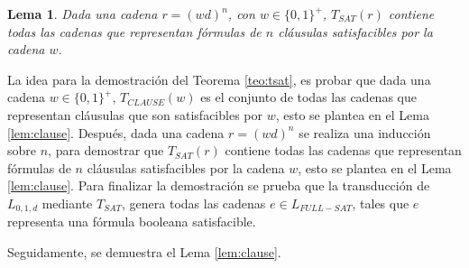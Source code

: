 \documentclass[12pt]{article}
\newtheorem{lemma}{Lema}
\begin{document}
\begin{lemma}
    \label{lem:sat}
    Dada una cadena $r=(wd)^n$, con $w\in\{0,1\}^+$, $T_{SAT}(r)$ contiene todas las cadenas que representan fórmulas de $n$ cláusulas satisfacibles por la cadena $w$.
\end{lemma}

La idea para la demostración del Teorema \ref{teo:tsat}, es probar que dada una cadena $w\in \{0,1\}^+$, 
$T_{CLAUSE}(w)$ es el conjunto de todas las cadenas que representan cláusulas que son satisfacibles por $w$, 
esto se plantea en el Lema \ref{lem:clause}. Después, dada una cadena $r=(wd)^n$ se realiza una inducción 
sobre $n$, para demostrar que $T_{SAT}(r)$ contiene todas las cadenas que representan fórmulas de $n$
cláusulas satisfacibles por la cadena $w$, esto se plantea en el Lema \ref{lem:clause}.  
Para finalizar la demostración se prueba que la transducción de $L_{0,1,d}$ mediante $T_{SAT}$, 
genera todas las cadenas $e\in L_{FULL-SAT}$, tales que $e$ representa una fórmula booleana 
satisfacible.

Seguidamente, se demuestra el Lema \ref{lem:clause}.
\end{document}
